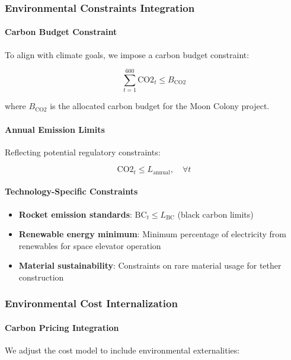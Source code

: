 \documentclass{mcmthesis}
\begin{document}
\subsubsection{Environmental Constraints Integration}

\paragraph{Carbon Budget Constraint}

To align with climate goals, we impose a carbon budget constraint:

\[
    \sum_{t=1}^{600} \text{CO2}_t \leq B_{\text{CO2}}
\]

where \(B_{\text{CO2}}\) is the allocated carbon budget for the Moon Colony project.

\paragraph{Annual Emission Limits}

Reflecting potential regulatory constraints:

\[
    \text{CO2}_t \leq L_{\text{annual}}, \quad \forall t
\]

\paragraph{Technology-Specific Constraints}
\begin{itemize}
    \item \textbf{Rocket emission standards}: \( \text{BC}_t \leq L_{\text{BC}} \) (black carbon limits)
    \item \textbf{Renewable energy minimum}: Minimum percentage of electricity from renewables for space elevator operation
    \item \textbf{Material sustainability}: Constraints on rare material usage for tether construction
\end{itemize}

\subsubsection{Environmental Cost Internalization}

\paragraph{Carbon Pricing Integration}

We adjust the cost model to include environmental externalities:
\end{document}
